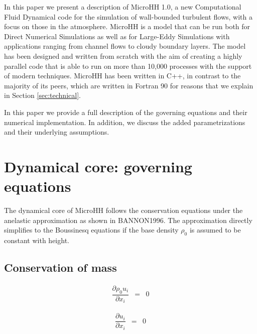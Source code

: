 \documentclass[gmd]{copernicus}
\begin{document}
\introduction  %
In this paper we present a description of MicroHH 1.0, a new Computational Fluid Dynamical code for the simulation of wall-bounded turbulent flows, with a focus on those in the atmosphere. MicroHH is a model that can be run both for Direct Numerical Simulations as well as for Large-Eddy Simulations with applications ranging from channel flows to cloudy boundary layers. The model has been designed and written from scratch with the aim of creating a highly parallel code that is able to run on more than 10,000 processes with the support of modern techniques. MicroHH has been written in C++, in contrast to the majority of its peers, which are written in Fortran 90 for reasons that we explain in Section \ref{sec:technical}.

In this paper we provide a full description of the governing equations and their numerical implementation. In addition, we discuss the added parametrizations and their underlying assumptions.

\section{Dynamical core: governing equations}
The dynamical core of MicroHH follows the conservation equations under the anelastic approximation as shown in BANNON1996. The approximation directly simplifies to the Boussinesq equations if the base density $\rho_0$ is assumed to be constant with height.

\subsection{Conservation of mass}
\begin{eqnarray}
\dfrac{\partial \rho_0 u_i}{\partial x_i} & = & 0\label{eq:consmassa}
\end{eqnarray}

\begin{eqnarray}
\dfrac{\partial u_i}{\partial x_i} & = & 0\label{eq:consmassb}
\end{eqnarray}
\end{document}
